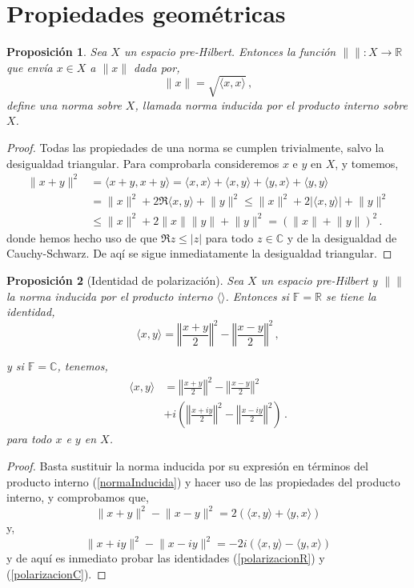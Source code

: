 \documentclass[12pt]{book}
\newtheorem{prop}{\bf Proposición}[chapter]
\def\RR{\mathbb{R}}
\def\CC{\mathbb{C}}
\def\FF{\mathbb{F}}
\newcommand{\abs}[1]{\lvert #1\rvert }
\newcommand{\norm}[1]{\lVert #1\rVert }
\newcommand{\lin}[1]{\langle #1 \rangle}
\newcommand{\Norm}[1]{\left\Vert #1\right\Vert }
\begin{document}
\section{Propiedades geométricas}
\begin{prop} Sea $X$ un espacio pre-Hilbert. Entonces la función $\norm{}:X\longrightarrow\RR$ que envía $x\in X$  a $\norm{x}$ dada por,
\begin{equation}
\norm{x}=\sqrt{\langle x,x\rangle}\,,\label{normaInducida}
\end{equation}
define  una norma sobre $X$, llamada {\em norma inducida} por el producto interno sobre $X$.
\end{prop}
\begin{proof}
Todas las propiedades de una norma se cumplen trivialmente, salvo la desigualdad triangular. Para comprobarla consideremos $x$  e $y$ en $X$, y  tomemos,
\begin{align*}
\norm{x+y}^2&=\langle x+y,x+y\rangle = \langle x,x\rangle+ \langle x,y\rangle+\langle y,x\rangle+\langle y,y\rangle\\
&=\norm{x}^2+2\Re{\langle x,y\rangle} +\norm{y}^2\leq \norm{x}^2+2\abs{\langle x,y\rangle}+\norm{y}^2 \\
&\leq\norm{x}^2+2\norm{x}\norm{y} +\norm{y}^2=(\norm{x}+ \norm{y})^2\,. 
\end{align*}
donde hemos hecho uso de que $\Re  z \leq \abs{z}$ para todo $z\in\CC$ y de la desigualdad de Cauchy-Schwarz. De aqí se sigue inmediatamente la desigualdad triangular.

\end{proof}

\begin{prop}[Identidad de polarización]
Sea $X$ un espacio pre-Hilbert y $\norm{}$ la norma inducida por el producto interno $\langle\rangle$. Entonces si $\FF=\RR$ se tiene la identidad,
\begin{equation}
\langle x,y\rangle = \Norm{\frac{x+y}{2}}^2-\Norm{\frac{x-y}{2}}^2\,,\label{polarizacionR}
\end{equation}

y  si  $\FF=\CC$, tenemos,
\begin{align}
\langle x,y\rangle &= \Norm{\frac{x+y}{2}}^2-\Norm{\frac{x-y}{2}}^2\nonumber\\
&+i\left(\Norm{\frac{x+iy}{2}}^2-\Norm{\frac{x-iy }{2}}^2\right)\,.\label{polarizacionC}
\end{align}
para todo $x$ e $y$ en $X$. 
\end{prop}
\begin{proof}
Basta sustituir la norma inducida por su expresión en términos del producto interno (\ref{normaInducida}) y hacer uso de las propiedades del producto interno,  y comprobamos que,
$$\norm{x+y}^2-\norm{x-y}^2=2\left(\lin{x,y}+ \lin{y,x}\right)$$
y,
$$\norm{x+iy}^2-\norm{x-iy}^2=-2i\left(\lin{x,y}-\lin{y,x}\right)$$
y de aquí es inmediato probar las identidades (\ref{polarizacionR})  y (\ref{polarizacionC}).

\end{proof}
\end{document}
